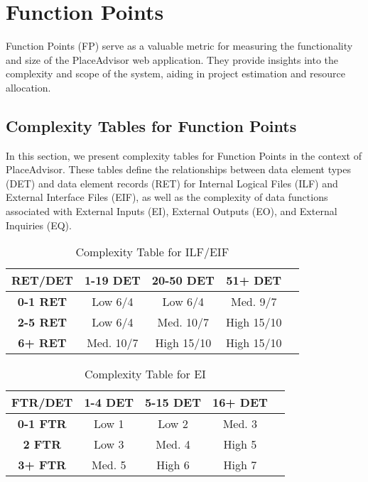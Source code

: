 \documentclass[../main.tex]{subfiles}
\begin{document}
\section{Function Points}\label{sec:functionpoints}

Function Points (FP) serve as a valuable metric for measuring the functionality and size of the PlaceAdvisor web application. They provide insights into the complexity and scope of the system, aiding in project estimation and resource allocation.

\subsection{Complexity Tables for Function Points}

In this section, we present complexity tables for Function Points in the context of PlaceAdvisor. These tables define the relationships between data element types (DET) and data element records (RET) for Internal Logical Files (ILF) and External Interface Files (EIF), as well as the complexity of data functions associated with External Inputs (EI), External Outputs (EO), and External Inquiries (EQ).

\begin{table}[h]
\centering
\begin{tabular}{|c|c|c|c|c|}
\hline
\textbf{RET/DET} & \textbf{1-19 DET} & \textbf{20-50 DET} & \textbf{51+ DET} \\
\hline
\textbf{0-1 RET} & Low 6/4 & Low 6/4 & Med. 9/7 \\
\textbf{2-5 RET} & Low 6/4 & Med. 10/7 & High 15/10 \\
\textbf{6+ RET} & Med. 10/7 & High 15/10 & High 15/10 \\
\hline
\end{tabular}
\caption{Complexity Table for ILF/EIF}
\end{table}

\begin{table}[h]
\centering
\begin{tabular}{|c|c|c|c|c|}
\hline
\textbf{FTR/DET} & \textbf{1-4 DET} & \textbf{5-15 DET} & \textbf{16+ DET} \\
\hline
\textbf{0-1 FTR} & Low 1 & Low 2 & Med. 3 \\
\textbf{2 FTR} & Low 3 & Med. 4 & High 5 \\
\textbf{3+ FTR} & Med. 5 & High 6 & High 7 \\
\hline
\end{tabular}
\caption{Complexity Table for EI}
\end{table}
\end{document}
